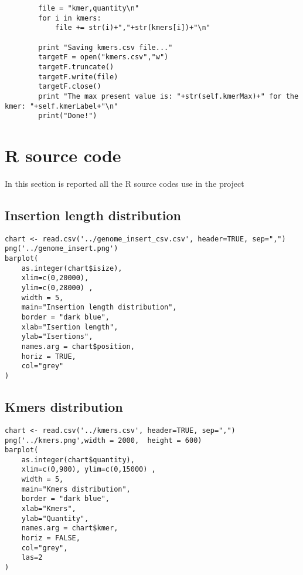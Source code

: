 \begin{verbatim}
        file = "kmer,quantity\n"
        for i in kmers:
            file += str(i)+","+str(kmers[i])+"\n"

        print "Saving kmers.csv file..."
        targetF = open("kmers.csv","w")
        targetF.truncate()
        targetF.write(file)
        targetF.close()
        print "The max present value is: "+str(self.kmerMax)+" for the kmer: "+self.kmerLabel+"\n"
        print("Done!")
\end{verbatim}



\newpage
\section{R source code}
In this section is reported all the R source codes use in the project


\subsection{Insertion length distribution}
\tiny
\begin{verbatim}
chart <- read.csv('../genome_insert_csv.csv', header=TRUE, sep=",")
png('../genome_insert.png')
barplot(
	as.integer(chart$isize), 
	xlim=c(0,20000),
	ylim=c(0,28000) , 
	width = 5,
	main="Insertion length distribution", 
	border = "dark blue", 
	xlab="Isertion length", 
	ylab="Isertions", 
	names.arg = chart$position, 
	horiz = TRUE, 
	col="grey"
)
\end{verbatim}


\subsection{Kmers distribution}
\tiny
\begin{verbatim}
chart <- read.csv('../kmers.csv', header=TRUE, sep=",")
png('../kmers.png',width = 2000,  height = 600)
barplot(
	as.integer(chart$quantity), 
	xlim=c(0,900), ylim=c(0,15000) , 
	width = 5, 
	main="Kmers distribution", 
	border = "dark blue", 
	xlab="Kmers", 
	ylab="Quantity", 
	names.arg = chart$kmer, 
	horiz = FALSE, 
	col="grey", 
	las=2
)
\end{verbatim}